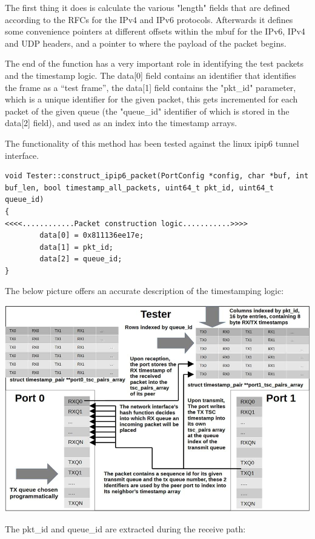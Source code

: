\documentclass[a4paper,12p]{article}
\begin{document}
The first thing it does is calculate the various "length" fields that are defined according to the RFCs for the IPv4 and IPv6 protocols. Afterwards it defines some convenience pointers at different offsets within the mbuf for the IPv6, IPv4 and UDP headers, and a pointer to where the payload of the packet begins.

The end of the function has a very important role in identifying the test packets and the timestamp logic. The data[0] field contains an identifier that identifies the frame as a “test frame”, the data[1] field contains the "pkt\_id" parameter, which is a unique identifier for the given packet, this gets incremented for each packet of the given queue (the "queue\_id" identifier of which is stored in the data[2] field), and used as an index into the timestamp arrays.

The functionality of this method has been tested against the linux ipip6 tunnel interface.

\begin{lstlisting}
void Tester::construct_ipip6_packet(PortConfig *config, char *buf, int buf_len, bool timestamp_all_packets, uint64_t pkt_id, uint64_t queue_id)
{
<<<<............Packet construction logic...........>>>>
        data[0] = 0x811136ee17e;
        data[1] = pkt_id;
        data[2] = queue_id;
}

\end{lstlisting}

The below picture offers an accurate description of the timestamping logic:

\includegraphics[width=\textwidth]{6transperfarchitecture}


The pkt\_id and queue\_id are extracted during the receive path:
\end{document}
